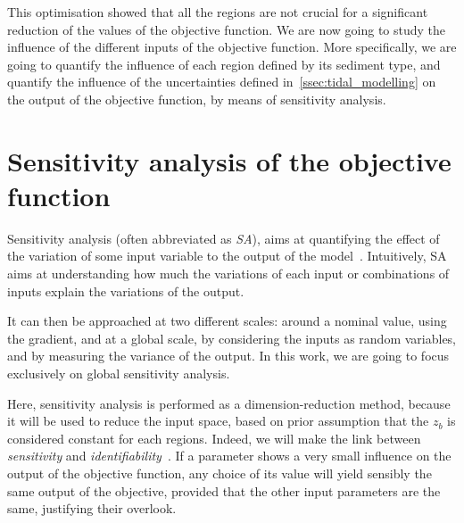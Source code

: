 \documentclass[../../Main_ManuscritThese.tex]{subfiles}
\newcommand{\zob}{z_b}
\begin{document}
This optimisation showed that all the regions are not crucial for a
significant reduction of the values of the objective function.
We are now going to study the influence of the different inputs of the
objective function. More specifically, we are going to quantify the
influence of each region defined by its sediment type, and quantify
the influence of the uncertainties defined
in~\cref{ssec:tidal_modelling} on the output of the objective
function, by means of sensitivity analysis.


\section{Sensitivity analysis of the objective function}
\label{sec:sensitivity-analysis}
Sensitivity analysis (often abbreviated as \emph{SA}), aims at
quantifying the effect of the variation of some input variable to the
output of the model~\citep{iooss_revue_2011,janon_analyse_2012}.
Intuitively, SA aims at understanding how much the variations
of each input or combinations of inputs explain the variations of the
output.

It can then be approached at two different scales:
around a nominal value, using the gradient, and at a global scale, by
considering the inputs as random variables, and by measuring the
variance of the output. In this work, we are going to focus
exclusively on global sensitivity analysis.

Here, sensitivity analysis is performed as a dimension-reduction
method, because it will be used to reduce the input space, based on
prior assumption that the $\zob$ is considered constant for
each regions. Indeed, we will make the link between \emph{sensitivity}
and \emph{identifiability}~\citep{dobre_global_2010}. %
If a parameter shows a very small influence on the output of the
objective function, any choice of its value will yield sensibly the
same output of the objective, provided that the other input parameters
are the same, justifying their overlook.
\end{document}
